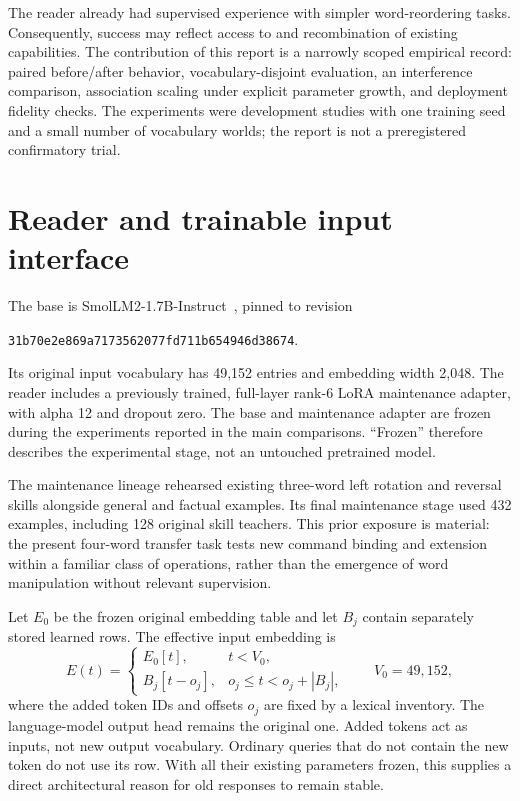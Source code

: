 \documentclass[11pt]{article}
\begin{document}
The reader already had supervised experience with simpler word-reordering tasks. Consequently, success may reflect access to and recombination of existing capabilities. The contribution of this report is a narrowly scoped empirical record: paired before/after behavior, vocabulary-disjoint evaluation, an interference comparison, association scaling under explicit parameter growth, and deployment fidelity checks. The experiments were development studies with one training seed and a small number of vocabulary worlds; the report is not a preregistered confirmatory trial.

\section{Reader and trainable input interface}
\label{sec:method}
The base is SmolLM2-1.7B-Instruct~\cite{smollm}, pinned to revision
\begin{center}\small\texttt{31b70e2e869a7173562077fd711b654946d38674}.\end{center}
Its original input vocabulary has 49,152 entries and embedding width 2,048. The reader includes a previously trained, full-layer rank-6 LoRA maintenance adapter, with alpha 12 and dropout zero. The base and maintenance adapter are frozen during the experiments reported in the main comparisons. ``Frozen'' therefore describes the experimental stage, not an untouched pretrained model.

The maintenance lineage rehearsed existing three-word left rotation and reversal skills alongside general and factual examples. Its final maintenance stage used 432 examples, including 128 original skill teachers. This prior exposure is material: the present four-word transfer task tests new command binding and extension within a familiar class of operations, rather than the emergence of word manipulation without relevant supervision.

Let $E_0$ be the frozen original embedding table and let $B_j$ contain separately stored learned rows. The effective input embedding is
\[
 E(t)=\begin{cases}E_0[t],&t<V_0,\\B_j[t-o_j],&o_j\leq t<o_j+|B_j|,\end{cases}
 \qquad V_0=49{,}152,
\]
where the added token IDs and offsets $o_j$ are fixed by a lexical inventory. The language-model output head remains the original one. Added tokens act as inputs, not new output vocabulary. Ordinary queries that do not contain the new token do not use its row. With all their existing parameters frozen, this supplies a direct architectural reason for old responses to remain stable.
\end{document}

